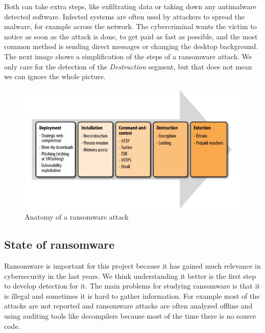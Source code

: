 \linej
Both can take extra steps, like exfiltrating data or taking down any antimalware detected software.
Infected systems are often used by attackers to spread the malware, for example across the network.
The cybercriminal wants the victim to notice as soon as the attack is done, to get paid as fast as possible, and the most common method is sending direct messages or changing the desktop background.
\linej
\linej
The next image shows a simplification of the steps of a ransomware attack.
We only care for the detection of the \textit{Destruction} segment, but that does not mean we can ignore the whole picture.
\begin{figure}[H]
	\centering
	\includegraphics[width=\textwidth]{figuras/anatomy_of_a_ransomware_attack.png}
	\caption{Anatomy of a ransomware attack\cite{ransomware_oReilly}}
\end{figure}

\subsection{State of ransomware}
Ransomware is important for this project because it has gained much relevance in cybersecurity in the last years.
We think understanding it better is the first step to develop detection for it.
\linej
\linej
The main problems for studying ransomware is that it is illegal and sometimes it is hard to gather information.
For example most of the attacks are not reported and ransomware attacks are often analyzed offline and using auditing tools like decompilers because most of the time there is no source code\cite{ransomware_digital_extortion}.

